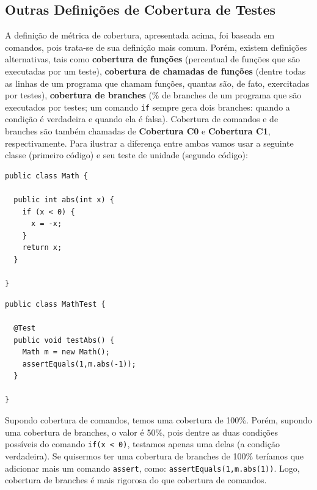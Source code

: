 \documentclass[
  11pt,
  twoside]{book}
\newcommand{\passthrough}[1]{#1}
\begin{document}
\hypertarget{outras-definiuxe7uxf5es-de-cobertura-de-testes}{%
\subsection{Outras Definições de Cobertura de
Testes}\label{outras-definiuxe7uxf5es-de-cobertura-de-testes}}

 A definição de métrica de
cobertura, apresentada acima, foi baseada em comandos, pois trata-se de
sua definição mais comum. Porém, existem definições alternativas, tais
como \textbf{cobertura de funções} (percentual de funções que são
executadas por um teste), \textbf{cobertura de chamadas de funções}
(dentre todas as linhas de um programa que chamam funções, quantas são,
de fato, exercitadas por testes), \textbf{cobertura de branches} (\% de
branches de um programa que são executados por testes; um comando
\passthrough{\lstinline!if!} sempre gera dois branches: quando a
condição é verdadeira e quando ela é falsa). Cobertura de comandos e de
branches são também chamadas de \textbf{Cobertura C0} e
\textbf{Cobertura C1}, respectivamente. Para ilustrar a diferença entre
ambas vamos usar a seguinte classe (primeiro código) e seu teste de
unidade (segundo código):

\begin{lstlisting}
public class Math {

  public int abs(int x) {
    if (x < 0) {  
      x = -x;
    }  
    return x;
  }

}
\end{lstlisting}

\begin{lstlisting}
public class MathTest {

  @Test
  public void testAbs() {
    Math m = new Math();
    assertEquals(1,m.abs(-1));
  }

}
\end{lstlisting}

Supondo cobertura de comandos, temos uma cobertura de 100\%. Porém,
supondo uma cobertura de branches, o valor é 50\%, pois dentre as duas
condições possíveis do comando \passthrough{\lstinline!if(x < 0)!},
testamos apenas uma delas (a condição verdadeira). Se quisermos ter uma
cobertura de branches de 100\% teríamos que adicionar mais um comando
\passthrough{\lstinline!assert!}, como:
\passthrough{\lstinline!assertEquals(1,m.abs(1))!}. Logo, cobertura de
branches é mais rigorosa do que cobertura de comandos.
\end{document}
